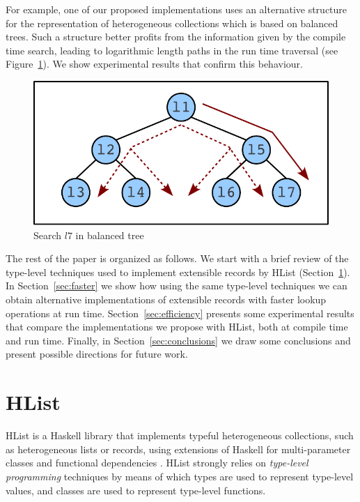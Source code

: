 \documentclass[natbib]{sigplanconf}
\newcommand{\Varid}[1]{\mathit{#1}}
\begin{document}
For example, one of our proposed implementations uses an alternative structure for the representation of heterogeneous collections which is based on balanced trees.
Such a structure better profits from the information given by the compile time search, leading to logarithmic length paths in the run time traversal (see Figure~\ref{fig:search-skew}). 
We show experimental results that confirm this behaviour. 

\begin{figure}[tp]
\begin{center}
\includegraphics[scale=0.5]{search-skew.pdf}
\end{center}
\caption{Search \ensuremath{\Varid{l7}} in balanced tree} \label{fig:search-skew}
\end{figure}


The rest of the paper is organized as follows. 
We start with a brief review of the type-level techniques used to implement extensible records 
by HList (Section~\ref{sec:hlist}). 
In Section~\ref{sec:faster} we show how using the same type-level techniques we can obtain alternative implementations of extensible records with faster lookup operations at run time. 
Section~\ref{sec:efficiency} presents some experimental results that compare the implementations we propose with HList, both at compile time and run time. 
Finally, in Section~\ref{sec:conclusions} we draw some conclusions and present possible directions for future work.



\section{HList}\label{sec:hlist}

HList is a Haskell library that implements typeful heterogeneous collections, 
such as heterogeneous lists or records, using extensions of Haskell for multi-parameter 
classes \cite{PJM97} and functional dependencies \cite{Jon00}.
HList strongly relies on \emph{type-level programming} techniques by means of which
types are used to represent type-level values, and classes are used to represent 
type-level functions.
\end{document}
